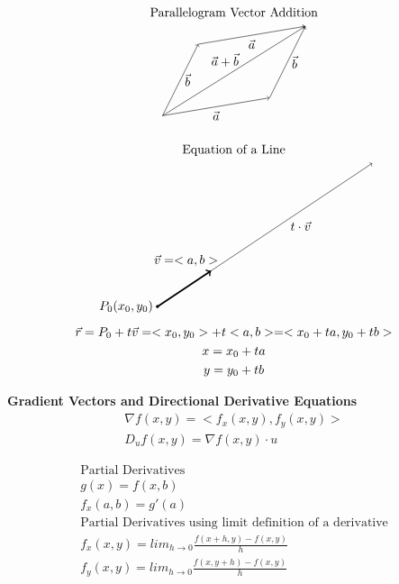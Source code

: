 \documentclass{article}
\begin{document}
\begin{gather*}
    \text{Parallelogram Vector Addition}
    \\
    \begin{tikzpicture}
        \draw[->](0,0)--(1,2);
        \draw[->](0,0)--(3,0.5);
        \node[anchor=north] at (1.5,0.25) {$\Vec{a}$};
        \node[anchor=west] at (0.5,1) {$\Vec{b}$};
        \draw[->](1,2)--(4,2.5);
        \draw[->](3,0.5)--(4,2.5);
        \node[anchor=north] at (2.5,2.25) {$\Vec{a}$};
        \node[anchor=west] at (3.5,1.5) {$\Vec{b}$};
        \draw[->](0,0)--(4,2.5);
        \node[anchor=south] at (1.75,1.25) {$\Vec{a}+\Vec{b}$};
    \end{tikzpicture}
\end{gather*}

\begin{gather*}
    \text{Equation of a Line}
    \\
    \begin{tikzpicture}
        \draw[->, line width=1.25pt](0,0)--(1.5,1);
        \node[anchor=south] at (0.8,1) {$\Vec{v}=<a,b>$};
        \filldraw[black] (0,0) circle(1pt) node[anchor=east] {$P_0(x_0,y_0)$};
        \draw[->](0,0)--(6,4);
        \node[anchor=south] at (4,2) {$t\cdot\Vec{v}$};
    \end{tikzpicture}
    \\
    \Vec{r}=P_0+t\Vec{v}=<x_0,y_0>+t<a,b>=<x_0+ta,y_0+tb>
    \\
    x=x_0+ta
    \\
    y=y_0+tb
\end{gather*}

\textbf{Gradient Vectors and Directional Derivative Equations}
\\
\begin {gather*}
    \nabla f(x,y) = <f_x(x,y), f_y(x,y)>
    \\
    D_uf(x,y)= \nabla f(x,y) \cdot u          
\end{gather*}              

\begin{gather*}
\text{Partial Derivatives}
\\
g(x)=f(x,b)
\\
f_x(a,b)=g'(a)
\\
\text{Partial Derivatives using limit definition of a derivative}
\\
f_x(x,y)=lim_{h\xrightarrow{}0} \frac{f(x+h,y)-f(x,y)}{h}
\\
f_y(x,y)=lim_{h\xrightarrow{}0} \frac{f(x,y+h)-f(x,y)}{h}
\end{gather*}
\end{document}
